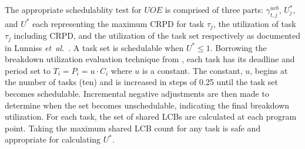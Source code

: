The appropriate schedulablity test for ${UOE}$ is comprised of three parts: ${\gamma^{ucb}_{t,j}}$, ${U^*_j}$, and ${U^*}$ each representing
the maximum CRPD for task \begin{math}\tau_{j}\end{math}, the utilization of task \begin{math}\tau_{j}\end{math} including CRPD, and the utilization of the task set
respectively as documented in Lunniss \emph{et~al.}~\cite{lunniss:13}. A task set is schedulable when ${U^* \le 1}$.
%
\newline
\indent
%
Borrowing the breakdown utilization evaluation technique from \cite{lunniss:13}, each task has its deadline and period set to ${T_i = P_i = u \cdot C_i}$ where ${u}$ is a constant. The constant, ${u}$, begins at the number of tasks (ten) and is increased in steps of 0.25 until the task set becomes schedulable. Incremental negative adjustments are then made to determine when the set becomes unschedulable, indicating the final breakdown utilization.
%
For each task, the set of shared LCBs are calculated at each program point. Taking the maximum shared LCB count for any task is safe and appropriate for calculating ${U^*}$.

